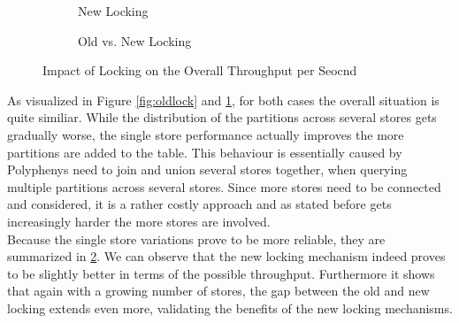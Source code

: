 \begin{figure}[t]
\begin{subfigure}{.5\textwidth}
      \caption{New Locking}
      \label{fig:newlock}
    \end{subfigure}
    \begin{subfigure}{.7\textwidth}
        \centering
        \caption{Old vs. New Locking}
        \label{fig:oldandnewlock}
      \end{subfigure}
    \caption{Impact of Locking on the Overall Throughput per Seocnd}
    \label{fig:lock_comp}
\end{figure}


As visualized in Figure \ref{fig:oldlock} and \ref{fig:newlock}, for both cases the overall situation is quite similiar.
While the distribution of the partitions across several stores gets gradually worse, the single store performance actually improves the more partitions are added to the table.
This behaviour is essentially caused by Polyphenys need to join and union several stores together, when querying multiple partitions across several stores.
Since more stores need to be connected and considered, it is a rather costly approach and as stated before gets increasingly harder the more stores are involved.\\

Because the single store variations prove to be more reliable, they are summarized in \ref{fig:oldandnewlock}.
We can observe that the new locking mechanism indeed proves to be slightly better in terms of the possible throughput.
Furthermore it shows that again with a growing number of stores, the gap between the old and new locking extends even more, validating the benefits of the new locking mechanisms.




